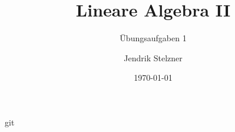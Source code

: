 \documentclass[a4paper,10pt]{scrartcl}
\title{Lineare Algebra II}
\subtitle{Übungsaufgaben 1}
\author{Jendrik Stelzner}
\date{\today}
\begin{document}
\maketitle

git 
\end{document}
